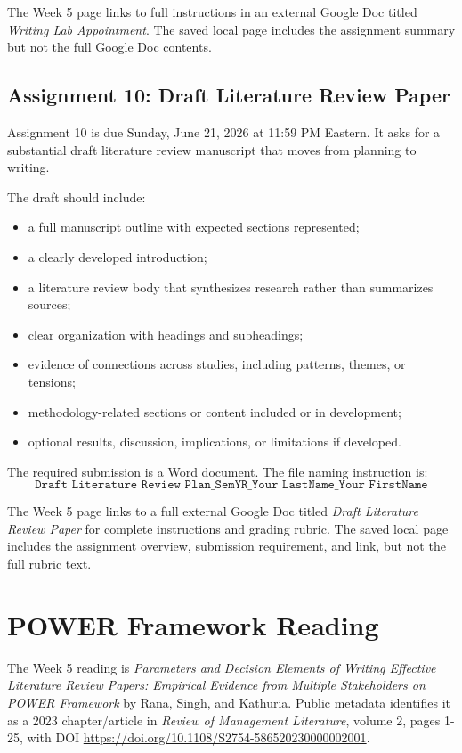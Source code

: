 \documentclass[10pt,letterpaper]{article}
\begin{document}
The Week 5 page links to full instructions in an external Google Doc titled \emph{Writing Lab Appointment}. The saved local page includes the assignment summary but not the full Google Doc contents.

\subsection{Assignment 10: Draft Literature Review Paper}

Assignment 10 is due Sunday, June 21, 2026 at 11:59 PM Eastern. It asks for a substantial draft literature review manuscript that moves from planning to writing.

The draft should include:

\begin{itemize}
\item a full manuscript outline with expected sections represented;
\item a clearly developed introduction;
\item a literature review body that synthesizes research rather than summarizes sources;
\item clear organization with headings and subheadings;
\item evidence of connections across studies, including patterns, themes, or tensions;
\item methodology-related sections or content included or in development;
\item optional results, discussion, implications, or limitations if developed.
\end{itemize}

The required submission is a Word document. The file naming instruction is:
\[
\texttt{Draft Literature Review Plan\_SemYR\_Your LastName\_Your FirstName}
\]

The Week 5 page links to a full external Google Doc titled \emph{Draft Literature Review Paper} for complete instructions and grading rubric. The saved local page includes the assignment overview, submission requirement, and link, but not the full rubric text.

\section{POWER Framework Reading}

The Week 5 reading is \emph{Parameters and Decision Elements of Writing Effective Literature Review Papers: Empirical Evidence from Multiple Stakeholders on POWER Framework} by Rana, Singh, and Kathuria. Public metadata identifies it as a 2023 chapter/article in \emph{Review of Management Literature}, volume 2, pages 1-25, with DOI \url{https://doi.org/10.1108/S2754-586520230000002001}.
\end{document}
